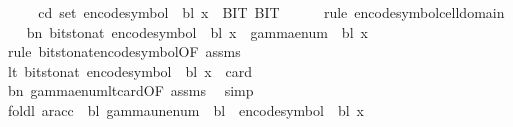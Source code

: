 \begin{isabellebody}
%
\isadelimproof
%
\endisadelimproof
%
\isatagproof
{}\isamarkupfalse%
\ {\isacharminus}{\kern0pt}\isanewline
\ \ \isamarkupfalse%
\ cd{\isacharcolon}{\kern0pt}\ {\isachardoublequoteopen}set\ {\isacharparenleft}{\kern0pt}encode{\isacharunderscore}{\kern0pt}symbol\ {\isasymGamma}\ bl\ x{\isacharparenright}{\kern0pt}\ {\isasymsubseteq}\ {\isacharbraceleft}{\kern0pt}BIT{}{\isacharcomma}{\kern0pt}\ BIT{}{\isacharbraceright}{\kern0pt}{\isachardoublequoteclose}\isanewline
\ \ \ \ \isamarkupfalse%
\ {\isacharparenleft}{\kern0pt}rule\ encode{\isacharunderscore}{\kern0pt}symbol{\isacharunderscore}{\kern0pt}cell{\isacharunderscore}{\kern0pt}domain{\isacharparenright}{\kern0pt}\isanewline
\ \ \isamarkupfalse%
\ bn{\isacharcolon}{\kern0pt}\ {\isachardoublequoteopen}bits{\isacharunderscore}{\kern0pt}to{\isacharunderscore}{\kern0pt}nat\ {\isacharparenleft}{\kern0pt}encode{\isacharunderscore}{\kern0pt}symbol\ {\isasymGamma}\ bl\ x{\isacharparenright}{\kern0pt}\ {\isacharequal}{\kern0pt}\ gamma{\isacharunderscore}{\kern0pt}enum\ {\isasymGamma}\ bl\ x{\isachardoublequoteclose}\isanewline
\ \ \ \ \isamarkupfalse%
\ {\isacharparenleft}{\kern0pt}rule\ bits{\isacharunderscore}{\kern0pt}to{\isacharunderscore}{\kern0pt}nat{\isacharunderscore}{\kern0pt}encode{\isacharunderscore}{\kern0pt}symbol{\isacharbrackleft}{\kern0pt}OF\ assms{\isacharbrackright}{\kern0pt}{\isacharparenright}{\kern0pt}\isanewline
\ \ \isamarkupfalse%
\ lt{\isacharcolon}{\kern0pt}\ {\isachardoublequoteopen}bits{\isacharunderscore}{\kern0pt}to{\isacharunderscore}{\kern0pt}nat\ {\isacharparenleft}{\kern0pt}encode{\isacharunderscore}{\kern0pt}symbol\ {\isasymGamma}\ bl\ x{\isacharparenright}{\kern0pt}\ {\isacharless}{\kern0pt}\ card\ {\isasymGamma}{\isachardoublequoteclose}\isanewline
\ \ \ \ \isamarkupfalse%
\ bn\ gamma{\isacharunderscore}{\kern0pt}enum{\isacharunderscore}{\kern0pt}lt{\isacharunderscore}{\kern0pt}card{\isacharbrackleft}{\kern0pt}OF\ assms{\isacharbrackright}{\kern0pt}\ \isamarkupfalse%
\ simp\isanewline
\ \ \isamarkupfalse%
\ {\isachardoublequoteopen}foldl\ {\isacharparenleft}{\kern0pt}ar{\isacharunderscore}{\kern0pt}acc\ {\isasymGamma}\ bl{\isacharparenright}{\kern0pt}\ {\isacharparenleft}{\kern0pt}gamma{\isacharunderscore}{\kern0pt}unenum\ {\isasymGamma}\ bl\ {}{\isacharparenright}{\kern0pt}\ {\isacharparenleft}{\kern0pt}encode{\isacharunderscore}{\kern0pt}symbol\ {\isasymGamma}\ bl\ x{\isacharparenright}{\kern0pt}\isanewline

\end{isabellebody}
